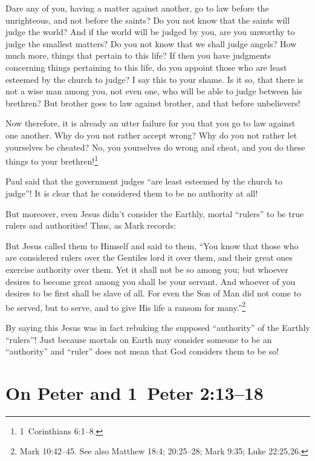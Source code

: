 \documentclass[letterpaper,12pt]{article}
\newenvironment{squote}
  {\small\quote}
  {\endquote\normalsize}
\newenvironment{squotation}
  {\small\quotation}
  {\endquotation\normalsize}
\begin{document}
\begin{squotation}
Dare any of you, having a matter against another, go to law before the unrighteous, and not before the saints? Do you not know that the saints will judge the world? And if the world will be judged by you, are you unworthy to judge the smallest matters? Do you not know that we shall judge angels? How much more, things that pertain to this life? If then you have judgments concerning things pertaining to this life, do you appoint those who are least esteemed by the church to judge? I say this to your shame. Is it so, that there is not a wise man among you, not even one, who will be able to judge between his brethren? But brother goes to law against brother, and that before unbelievers!

Now therefore, it is already an utter failure for you that you go to law against one another. Why do you not rather accept wrong? Why do you not rather let yourselves be cheated? No, you yourselves do wrong and cheat, and you do these things to your brethren!\footnote{1~Corinthians 6:1--8.}
\end{squotation}

Paul said that the government judges ``are least esteemed by the church to judge''! It is clear that he considered them to be no authority at all!

But moreover, even Jesus didn't consider the Earthly, mortal ``rulers'' to be true rulers and authorities! Thus, as Mark records:

\begin{squote}
But Jesus called them to Himself and said to them, ``You know that those who are considered rulers over the Gentiles lord it over them, and their great ones exercise authority over them. Yet it shall not be so among you; but whoever desires to become great among you shall be your servant. And whoever of you desires to be first shall be slave of all. For even the Son of Man did not come to be served, but to serve, and to give His life a ransom for many.''\footnote{Mark 10:42--45. See also Matthew 18:4; 20:25--28; Mark 9:35; Luke 22:25,26.}
\end{squote}

By saying this Jesus was in fact rebuking the supposed ``authority'' of the Earthly ``rulers''! Just because mortals on Earth may consider someone to be an ``authority'' and ``ruler'' does not mean that God considers them to be so!

\section{On Peter and 1~Peter 2:13--18}
\label{sec:OnPeterAnd1Peter21318}
\end{document}
